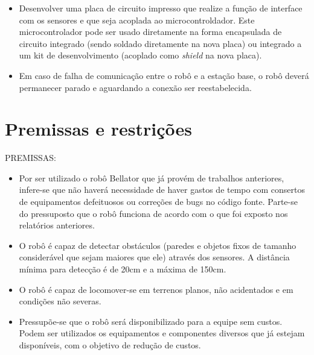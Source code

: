 \begin{itemize}
  \item Desenvolver uma placa de circuito impresso que realize a função de interface com os sensores e que seja acoplada ao microcontroldador. Este microcontrolador pode ser usado diretamente na forma encapsulada de circuito integrado (sendo soldado diretamente na nova placa) ou integrado a um kit de desenvolvimento (acoplado como \textit{shield} na nova placa).
  \item Em caso de falha de comunicação entre o robô e a estação base, o robô deverá permanecer parado e aguardando a conexão ser reestabelecida.
\end{itemize}

\chapter{Premissas e restrições}
PREMISSAS:
\begin{itemize}
  \item Por ser utilizado o robô Bellator que já provém de trabalhos anteriores, infere-se que não haverá necessidade de haver gastos de tempo com consertos de equipamentos defeituosos ou correções de bugs no código fonte. Parte-se do pressuposto que o robô funciona de acordo com o que foi exposto nos relatórios anteriores.
  \item O robô é capaz de detectar obstáculos (paredes e objetos fixos de tamanho considerável que sejam maiores que ele) através dos sensores. A distância mínima para detecção é de 20cm e a máxima de 150cm.
  \item O robô é capaz de locomover-se em terrenos planos, não acidentados e em condições não severas.
  \item Pressupõe-se que o robô será disponibilizado para a equipe sem custos.
Podem ser utilizados os equipamentos e componentes diversos que já estejam disponíveis, com o objetivo de redução de custos.
\end{itemize}

